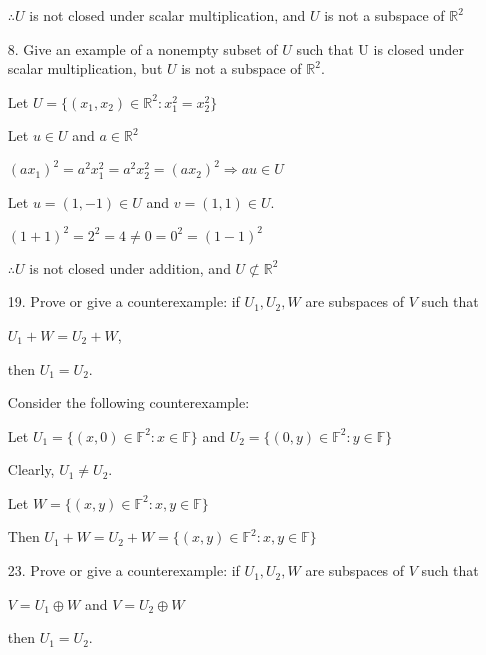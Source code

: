 \documentclass{article}
\begin{document}
\begin{enumerate}[nolistsep]
		$\therefore U$ is not closed under scalar multiplication, and $U$ is not a subspace of $\mathbb{R}^2$
		
		\item[8.] Give an example of a nonempty subset of $U$ such that U is closed under scalar multiplication, but $U$ is not a subspace of $\mathbb{R}^2$.
		
		Let $U = \{(x_1, x_2) \in \mathbb{R}^2 : x_1^2 = x_2^2\}$
		
		Let $u \in U$ and $a \in \mathbb{R}^2$
		
		$(ax_1)^2 = a^2x_1^2 = a^2x_2^2 = (ax_2)^2 \Rightarrow au \in U$
		
		Let $u = (1, -1) \in U$ and $v = (1, 1) \in U$.
		
		$(1 + 1)^2 = 2^2 = 4 \neq 0 = 0^2 = (1 - 1)^2$
		
		$\therefore U$ is not closed under addition, and $U \not\subset \mathbb{R}^2$
		
		\item[19.] Prove or give a counterexample: if $U_1, U_2, W$ are subspaces of $V$ such that
		
\centerline{$U_1 + W = U_2 + W$,}

then $U_1 = U_2$. 
		
		Consider the following counterexample:

		Let $U_1 = \{(x, 0) \in \mathbb{F}^2 : x \in \mathbb{F}\}$ and $U_2 = \{(0, y) \in \mathbb{F}^2 : y \in \mathbb{F}\}$
		
		Clearly, $U_1 \neq U_2$.
		
		Let $W = \{(x, y) \in \mathbb{F}^2 : x, y \in \mathbb{F}\}$
		
		Then $U_1 + W = U_2 + W = \{(x, y) \in \mathbb{F}^2 : x, y \in \mathbb{F}\}$
		
		\item[23.] Prove or give a counterexample: if $U_1, U_2, W$ are subspaces of $V$ such that
		
		\centerline{$V = U_1 \oplus W$ and $V = U_2 \oplus W$}
		
		then $U_1 = U_2$.
		
	\end{enumerate}
\end{document}
